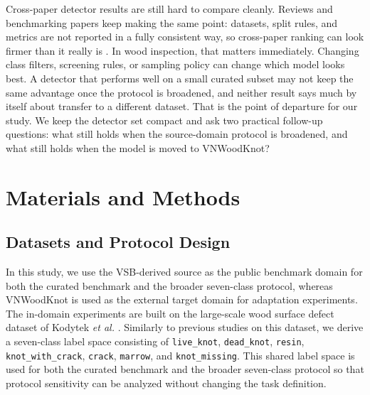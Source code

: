 \documentclass[10pt,a4paper]{article}
\begin{document}

Cross-paper detector results are still hard to compare cleanly. Reviews and benchmarking papers keep making the same point: datasets, split rules, and metrics are not reported in a fully consistent way, so cross-paper ranking can look firmer than it really is \citep{fdd_yolo,ma_2024_air,wang_2025_ieeeaccess}. In wood inspection, that matters immediately. Changing class filters, screening rules, or sampling policy can change which model looks best. A detector that performs well on a small curated subset may not keep the same advantage once the protocol is broadened, and neither result says much by itself about transfer to a different dataset. That is the point of departure for our study. We keep the detector set compact and ask two practical follow-up questions: what still holds when the source-domain protocol is broadened, and what still holds when the model is moved to VNWoodKnot?

\section{Materials and Methods}
\label{sec:methods}

\subsection{Datasets and Protocol Design}
\label{sec:datasets}

In this study, we use the VSB-derived source as the public benchmark domain for both the curated benchmark and the broader seven-class protocol, whereas VNWoodKnot is used as the external target domain for adaptation experiments. The in-domain experiments are built on the large-scale wood surface defect dataset of Kodytek \textit{et al.} \citep{kodytek_dataset}. Similarly to previous studies on this dataset, we derive a seven-class label space consisting of \texttt{live\_knot}, \texttt{dead\_knot}, \texttt{resin}, \texttt{knot\_with\_crack}, \texttt{crack}, \texttt{marrow}, and \texttt{knot\_missing}. This shared label space is used for both the curated benchmark and the broader seven-class protocol so that protocol sensitivity can be analyzed without changing the task definition.
\end{document}
